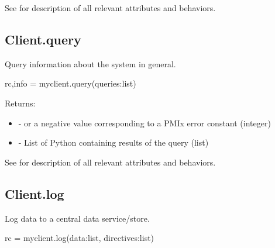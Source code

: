 See  for description of all relevant attributes and behaviors.


\subsection{Client.query}

\summary

Query information about the system in general.

\format

\pyspecificstart
\begin{codepar}
rc,info = myclient.query(queries:list)
\end{codepar}
\pyspecificend

\begin{arglist}
\end{arglist}

Returns:

\begin{itemize}
    \item {} -  or a negative value corresponding to a PMIx error constant (integer)
    \item {} - List of Python  containing results of the query (list)
\end{itemize}

See  for description of all relevant attributes and behaviors.


\subsection{Client.log}

\summary

Log data to a central data service/store.

\format

\pyspecificstart
\begin{codepar}
rc = myclient.log(data:list, directives:list)
\end{codepar}
\pyspecificend

\begin{arglist}
\end{arglist}

